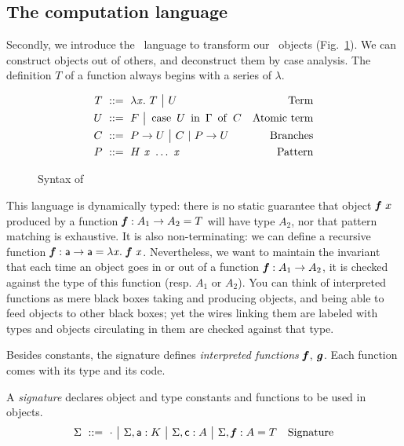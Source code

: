\documentclass{llncs}
\begin{document}
\subsection{The computation language}
\label{sec:comput}

Secondly, we introduce the \CL\ language to transform our \SLF\
objects (Fig.~\ref{fig:syntax-CL}). We can construct objects out of
others, and deconstruct them by case analysis. The definition $T$ of a function always begins with a series of
$\lambda$.

\begin{figure}[t]
  \begin{align*}
    T &\ ::=\  \lambda{\ensuremath{\text{\textit{x}}}}.\  T \ {\big|}\ 
    U & \text{Term} \\
    U &\ ::=\  F \ {\big|}\ 
    \operatorname{case}\ {{U}\ \operatorname{in}\ {\Gamma}}\ \operatorname{of}\  C & \text{Atomic term}\\
    C &\ ::=\  {P}\to U \ {\big|}\ 
    C\ |\ {P}\to U & \text{Branches}\\
    P &\ ::=\  {H}\  {\text{\textit{x}}}\ \ldots\ {\text{\textit{x}}} &\text{Pattern}
  \end{align*}
  \caption{Syntax of \CL}
\label{fig:syntax-CL}
\end{figure}

This language is dynamically typed: there is no static guarantee that
object ${\text{\textit{\textbf{f}}}}\  x$ produced by a function $\text{\textit{\textbf{f}}} : A_1\to A_2 =
T$ will have type $A_2$, nor that pattern matching is exhaustive. It
is also non-terminating: we can define a recursive function $\text{\textit{\textbf{f}}} :
\text{\textsf{a}}\to \text{\textsf{a}} = \lambda{\ensuremath{\text{\textit{x}}}}.\  {\text{\textit{\textbf{f}}}}\  {\text{\textit{x}}}$. Nevertheless, we
want to maintain the invariant that each time an object goes in or out
of a function $\text{\textit{\textbf{f}}} : A_1\to A_2$, it is checked against the type of
this function (resp. $A_1$ or $A_2$). You can think of interpreted
functions as mere black boxes taking and producing objects, and being
able to feed objects to other black boxes; yet the wires linking them
are labeled with types and objects circulating in them are checked
against that type.

Besides constants, the signature defines \emph{interpreted functions}
$\text{\textit{\textbf{f}}}$, $\text{\textit{\textbf{g}}}$. Each function comes with its type and its
code. 

\begin{definition}
  A \emph{signature} declares object and type constants and functions
  to be used in objects.
  \begin{align*}
    \Sigma &\ ::=\ 
    \cdot
    \ {\big|}\ 
    {\Sigma},{\text{\textsf{a}} : K}
    \ {\big|}\ 
    {\Sigma},{\text{\textsf{c}} : A}
    \ {\big|}\ 
    {\Sigma},{\text{\textit{\textbf{f}}} : A = T}
    &\text{Signature}
  \end{align*}
\end{definition}
\end{document}
